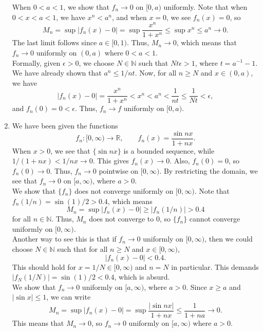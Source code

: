 \documentclass[10pt]{article}
\def\R{\mathbb{R}}
\def\N{\mathbb{N}}
\begin{document}
\begin{enumerate}
        When $0 < a < 1$, we show that $f_n \to 0$ on $[0, a)$ uniformly.
        Note that when $0 < x < a < 1$, we have $x^n < a^n$, and when $x = 0$, we
        see $f_n(x) = 0$, so \[
            M_n = \sup|f_n(x) - 0| = \sup \frac{x^n}{1 + x^n} \leq \sup x^n \leq a^n
            \to 0.
        \] The last limit follows since $a \in [0, 1)$. Thus, $M_n \to 0$, which
        means that $f_n \to 0$ uniformly on $(0, a)$ where $0 < a < 1$. \\

        Formally, given $\epsilon > 0$, we choose $N \in \N$ such that $Nt\epsilon
        > 1$, where $t = a^{-1} - 1$. We have already shown that
        $a^n \leq 1 / nt$. Now, for all $n \geq N$ and $x \in (0, a)$, we have \[
            |f_n(x) - 0| = \frac{x^n}{1 + x^n} < x^n < a^n < \frac{1}{nt} \leq \frac{1}{Nt} 
            < \epsilon,
        \] and $f_n(0) = 0 < \epsilon$. Thus, $f_n \to f$ uniformly on $[0, a)$.


        \item We have been given the functions \[
            f_n\colon [0, \infty) \to \R, \qquad f_n(x) = \frac{\sin{nx}}{1 + nx}.
        \] When $x > 0$, we see that $\{\sin{nx}\}$ is a bounded sequence, while $1
        / (1 + nx) < 1 /nx \to 0$. This gives $f_n(x) \to 0$. Also, $f_n(0) = 0$, so
        $f_n(0) \to 0$.  Thus, $f_n \to 0$ pointwise on $[0, \infty)$.  By
        restricting the domain, we see that $f_n \to 0$ on $[a, \infty)$, where $a >
        0$. \\
        
        We show that $\{f_n\}$ does not converge uniformly on $[0, \infty)$.
        Note that $f_n(1 / n) = \sin(1) /2 > 0.4$, which means \[
            M_n = \sup|f_n(x) - 0| \geq |f_n(1 /n)| > 0.4
        \] for all $n \in \N$. Thus, $M_n$ does not converge to $0$, so $\{f_n\}$ 
        cannot converge uniformly on $[0, \infty)$. \\

        Another way to see this is that if $f_n \to 0$ uniformly on $[0, \infty)$,
        then we could choose $N \in \N$ such that for all $n \geq N$ and $x \in [0,
        \infty)$, \[
            |f_n(x) - 0| < 0.4.
        \] This should hold for $x = 1 / N \in [0, \infty)$ and $n = N$ in
        particular.  This demands $|f_N(1 /N)| = \sin(1) / 2 < 0.4$, which is
        absurd. \\

        We show that $f_n \to 0$ uniformly on $[a, \infty)$, where $a > 0$.
        Since $x \geq a$ and $|\sin{x}| \leq 1$, we can write \[
            M_n = \sup|f_n(x) - 0| = \sup \frac{|\sin{nx}|}{1 + nx} \leq \frac{1}{1
            + na} \to 0.
        \] This means that $M_n \to 0$, so $f_n \to 0$ uniformly on $[a, \infty)$
        where $a > 0$. \\


\end{enumerate}
\end{document}
